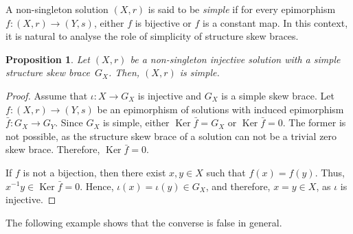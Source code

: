 \documentclass[12pt, a4paper, english]{article}
\newtheorem{proposicio}[teorema]{Proposition}
\theoremstyle{definition}
\theoremstyle{remark}
\DeclareMathOperator{\Ker}{Ker}
\begin{document}
A non-singleton solution $(X,r)$ is said to be \emph{simple} if for every epimorphism $f\colon (X,r) \rightarrow (Y,s)$, either $f$ is bijective or $f$ is a constant map. In this context, it is natural to analyse the role of simplicity of structure skew braces. 


\begin{proposicio}
\label{prop:G_Xsimple->Xsimple-INJECTIVE}
Let $(X,r)$ be a non-singleton injective solution with a simple structure skew brace~$G_X$. Then, $(X,r)$ is simple.
\end{proposicio}

\begin{proof}
Assume that $\iota \colon X \rightarrow G_X$ is injective and $G_X$ is a simple skew brace. Let $f\colon (X,r) \rightarrow (Y,s)$ be an epimorphism of solutions with induced epimorphism $\bar f\colon G_X \rightarrow G_Y$. Since $G_X$ is simple, either $\Ker \bar f = G_X$ or $\Ker \bar f = 0$. The former is not possible, as the structure skew brace of a solution can not be a trivial zero skew brace. Therefore, $\Ker \bar f = 0$. 

If $f$ is not a bijection, then there exist $x,y\in X$ such that $f(x) = f(y)$. Thus, $x^{-1}y\in \Ker \bar f = 0$. Hence, $\iota(x) = \iota(y) \in G_X$, and therefore, $x = y \in X$, as $\iota$ is injective.
\end{proof}

The following example shows that the converse is false in general.
\end{document}
